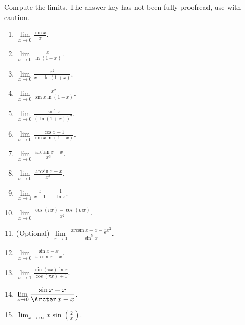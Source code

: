 Compute the limits. The answer key has not been fully proofread, use with caution.
\begin{multicols}{2}
\begin{enumerate}
\item $\displaystyle \lim\limits_{x\to 0} \frac{\sin x  }{x}$. 

\item $\displaystyle \lim\limits_{x\to 0} \frac{x}{\ln (1+x)}$. 

\item $\displaystyle \lim\limits_{x\to 0} \frac{x^2}{x-\ln (1+x)}$. 

\item $\displaystyle \lim\limits_{x\to 0} \frac{x^2}{\sin x\ln (1+x)}$. 

\item $\displaystyle \lim\limits_{x\to 0} \frac{\sin^2 x  }{\left(\ln (1+x)\right)^2}$.

\item $\displaystyle \lim\limits_{x\to 0} \frac{\cos x- 1}{\sin x\ln (1+x)}$.

\item $\displaystyle \lim\limits_{x\to 0} \frac{\arctan x -x}{x^3} $.

\item $\displaystyle \lim\limits_{x\to 0} \frac{\arcsin x -x}{x^3} $.

\item $\displaystyle \lim\limits_{x\to 1} \frac{x}{x-1}-\frac{1}{\ln x}$.

\item $\displaystyle \lim\limits_{x\to 0} \frac{\cos (nx) -\cos (mx)}{x^2 }$.

\item (Optional) \label{eqProblemLimlixto0(arcsinx-x-x^3/6)/(sin^5 x)}  $\displaystyle \lim \limits_{x\to 0} \frac{\arcsin x-x-\frac{1}{6}x^3}{\sin^5 x} $. 

\item $\displaystyle \lim\limits_{x\to 0} \frac{\sin x-x }{\arcsin x-x } $.

\item \label{problemLHospital (sin (pi x) ln x )/ (cos pi x +1)}  $\displaystyle \lim\limits_{x\to 1} \frac{\sin \left(\pi x \right)\ln x }{\cos(\pi x)+1 } $.

\item \label{problemlim x to 0 (sin x - x)/(arctan x - x)} $\displaystyle \lim\limits_{x\to 0}\frac{\sin x- x}{\Arctan x -x}$.

\item \label{problemlimxtoinftysin(2/x)}
$ {\displaystyle \lim_{x \to \infty} x \sin\left(\frac{2}{x}\right)}.$

\end{enumerate}
\end{multicols}